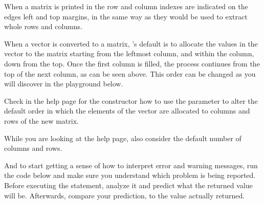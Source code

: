 \documentclass[krantz2]{krantz}\usepackage{knitr}
\begin{document}
When a matrix is printed in \Rlang the row and column indexes are indicated on the edges left and top margins, in the same way as they would be used to extract whole rows and columns.

When a vector is converted to a matrix, \Rlang's default is to allocate the values in the vector to the matrix starting from the leftmost column, and within the column, down from the top. Once the first column is filled, the process continues from the top of the next column, as can be seen above. This order can be changed as you will discover in the playground below.

\begin{playground}
Check in the help page for the  constructor how to use the  parameter to alter the default order in which the elements of the vector are allocated to columns and rows of the new matrix.

\begin{knitrout}\footnotesize
{}\color{fgcolor}\begin{kframe}
\begin{alltt}
\end{alltt}
\end{kframe}
\end{knitrout}

While you are looking at the help page, also consider the default number of columns and rows.

\begin{knitrout}\footnotesize
{}\color{fgcolor}\begin{kframe}
\begin{alltt}
\hlstd{(}\hlopt{:}\hlstd{)}
\end{alltt}
\end{kframe}
\end{knitrout}

And to start getting a sense of how to interpret error and warning messages, run the code below and make sure you understand which problem is being reported. Before executing the statement, analyze it and predict what the returned value will be. Afterwards, compare your prediction, to the value actually returned.

\begin{knitrout}\footnotesize
{}\color{fgcolor}\begin{kframe}
\begin{alltt}
\hlstd{(}\hlopt{:}\hlstd{,}  \hlstd{=} \hlstd{)}
\end{alltt}
\end{kframe}
\end{knitrout}

\end{playground}
\end{document}
